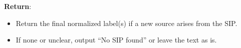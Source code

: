 \begin{figure*}[!ht]
\begin{tcolorbox}[
    width=\textwidth,
    colback=white,
    colframe=black,
    arc=4mm,
    boxrule=0.5pt,
    left=2mm,
    right=2mm,
    top=2mm,
    bottom=2mm,
    fonttitle=\bfseries,
    ]
\begin{tcolorbox}[
    colback=SkyBlue!10,
    boxrule=0pt,
    colframe=white,
    left=0pt,
    right=0pt,
    top=0pt,
    bottom=0pt,
    ]
\small
\textbf{Return}:
\begin{itemize}[noitemsep, leftmargin=15pt]
   \item Return the final normalized label(s) if a new source arises from the SIP.
   \item If none or unclear, output ``No SIP found'' or leave the text as is.
\end{itemize}
\end{tcolorbox}

\end{tcolorbox}
\label{fig:few-shot-norm}
\end{figure*}
